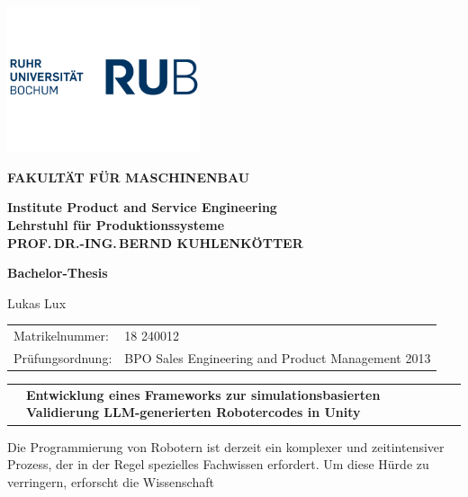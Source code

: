 \begin{titlepage}
  \rubflama %
  \thispagestyle{empty}

  \begin{minipage}{0.5\textwidth}%
    \includegraphics[width=56.9mm]{Figures/RUB-Logo-blau.png}
  \end{minipage}%
  \hfill%
  \begin{minipage}{0.5\textwidth}\raggedleft
    {\fontsize{9}{12}\selectfont \textcolor{rubgreen}{\bfseries FAKULTÄT FÜR
    MASCHINENBAU}}\par
    {\fontsize{8}{12}\selectfont \bfseries
      Institute Product and Service Engineering\\
      Lehrstuhl für Produktionssysteme\\
    PROF.\,DR.-ING.\,BERND KUHLENKÖTTER}%
  \end{minipage}
  \begin{center}
    {\bfseries \fontsize{16}{12}\selectfont Bachelor-Thesis}\par
    {Lukas Lux}
  \end{center}
  \begin{tabularx}{\textwidth}{@{}lX@{}}
    \fontsize{10}{12}\selectfont Matrikelnummer: &
    \fontsize{10}{12}\selectfont 1080 18 240012 \\
    \fontsize{10}{12}\selectfont Prüfungsordnung: &
    \fontsize{10}{12}\selectfont BPO Sales Engineering and Product
    Management 2013
  \end{tabularx}
  \smallbreak
  \begin{tabularx}{\textwidth}{@{}lX@{}}
    \fontsize{12}{12}\selectfont{\bfseries Thema:} & {\bfseries
      Entwicklung eines Frameworks zur simulationsbasierten Validierung
    LLM-generierten Robotercodes in Unity}
  \end{tabularx}
  \bigbreak
  \fontsize{10}{12}\selectfont Die Programmierung von Robotern ist derzeit ein
  komplexer und  zeitintensiver Prozess, der in der Regel spezielles Fachwissen
  erfordert. Um diese Hürde zu verringern, erforscht die Wissenschaft

\end{titlepage}
